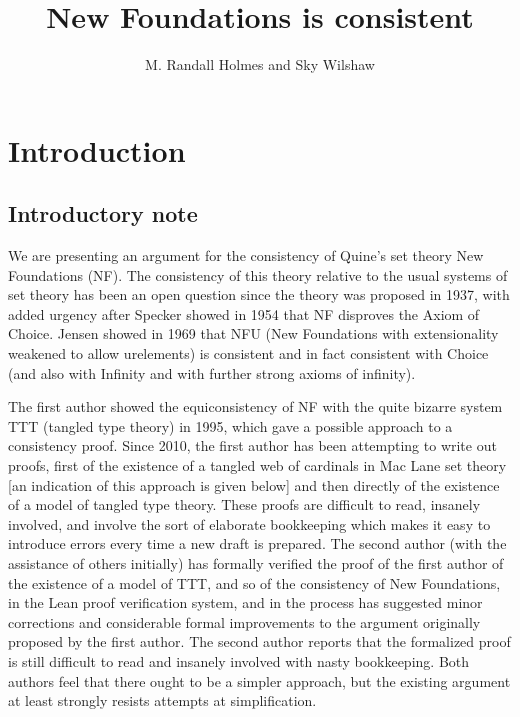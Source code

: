 \documentclass[112pt]{article}
\title{New Foundations is consistent}
\author{M. Randall Holmes and Sky Wilshaw}
\begin{document}
\maketitle

\tableofcontents

\newpage


\newpage

\section{Introduction}

\subsection{Introductory note}

We are presenting an argument for the consistency of Quine's set theory New Foundations (NF).  The consistency of this theory relative to the usual systems of set theory has been an open question since the theory was proposed in 1937, with added urgency after Specker showed in 1954 that NF disproves the Axiom of Choice.
Jensen showed in 1969 that NFU (New Foundations with extensionality weakened to allow urelements) is consistent and in fact consistent with Choice (and also with Infinity and with further strong axioms of infinity).  

The first author showed the equiconsistency of NF with the quite bizarre system TTT (tangled type theory) in 1995, which gave a possible approach to a consistency proof.  Since 2010, the first author has been attempting to write out proofs, first of the existence of a tangled web of cardinals in Mac Lane set theory [an indication of this approach is given below] and then directly of the existence of a model of tangled type theory.  These proofs are difficult to read, insanely involved, and involve the sort of elaborate bookkeeping which makes it easy to introduce errors every time a new draft is prepared.  The second author (with the assistance of others initially)
has formally verified the proof of the first author of the existence of a model of TTT, and so of the consistency of New Foundations, in the Lean proof verification system, and in the process has suggested minor corrections and considerable formal improvements to the argument originally proposed by the first author.  The second author reports that the formalized proof is still difficult to read and insanely involved with nasty bookkeeping.  Both authors feel that there ought to be a simpler approach, but the existing argument at least strongly resists attempts at simplification.
\end{document}
